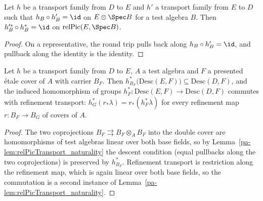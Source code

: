 \begin{lemma}
  \label{pa-lem:relPicTransport_inverse}
  \leanok

  Let \(h\) be a transport family from \(D\) to \(E\) and \(h'\) a transport family from
  \(E\) to \(D\) such that \(h_B \circ h'_B = \id\) on \(E \otimes \Spec B\) for a test
  algebra \(B\). Then \(h'^{*}_B \circ h_B^{*} = \id\) on
  \(\mathrm{relPic}(E, \Spec B)\).
\end{lemma}
\begin{proof}
  \leanok
  On a representative, the round trip pulls back along \(h_B \circ h'_B = \id\), and
  pullback along the identity is the identity.
\end{proof}

\begin{lemma}
  \label{pa-lem:relPicTransport_descent}
  \leanok

  Let \(h\) be a transport family from \(D\) to \(E\), \(A\) a test algebra and \(F\) a
  presented \'etale cover of \(A\) with carrier \(B_F\). Then
  \(h_{B_F}^{*}\bigl(\mathrm{Desc}(E, F)\bigr) \subseteq \mathrm{Desc}(D, F)\), and the
  induced homomorphism of groups
  \(h_F^{*} \colon \mathrm{Desc}(E, F) \to \mathrm{Desc}(D, F)\) commutes with refinement
  transport: \(h_{G}^{*}(r_{*}\lambda) = r_{*}(h_F^{*}\lambda)\) for every refinement map
  \(r \colon B_F \to B_G\) of covers of \(A\).
\end{lemma}
\begin{proof}
  \leanok
  The two coprojections \(B_F \rightrightarrows B_F \otimes_A B_F\) into the double cover
  are homomorphisms of test algebras linear over both base fields, so by
  Lemma~\ref{pa-lem:relPicTransport_naturality} the descent condition
  (equal pullbacks along the two coprojections) is preserved by \(h_{B_F}^{*}\).
  Refinement transport is restriction along the refinement map, which is again linear over
  both base fields, so the commutation is a second instance of
  Lemma~\ref{pa-lem:relPicTransport_naturality}.
\end{proof}

